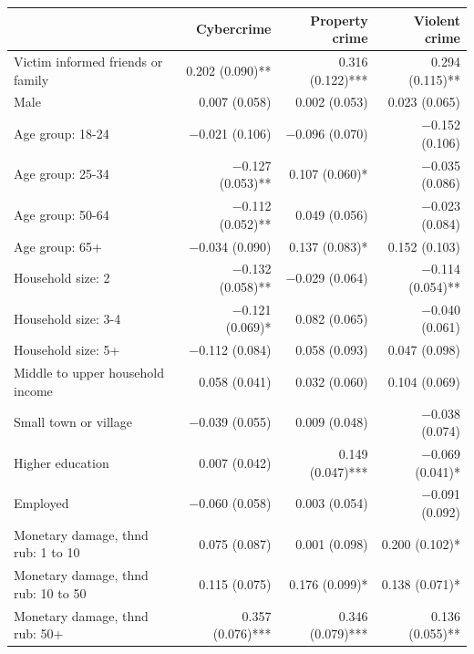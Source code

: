 \begingroup\centering
\begin{tabular}{lrrr}
	\addlinespace[5pt] 
	& Cybercrime & Property crime & Violent crime \\  
	\midrule

Victim informed friends or family & \num{0.202} (\num{0.090})** & \num{0.316} (\num{0.122})*** & \num{0.294} (\num{0.115})** \\
Male & \num{0.007} (\num{0.058}) & \num{0.002} (\num{0.053}) & \num{0.023} (\num{0.065}) \\
Age group: 18-24 & \num{-0.021} (\num{0.106}) & \num{-0.096} (\num{0.070}) & \num{-0.152} (\num{0.106}) \\
Age group: 25-34 & \num{-0.127} (\num{0.053})** & \num{0.107} (\num{0.060})* & \num{-0.035} (\num{0.086}) \\
Age group: 50-64 & \num{-0.112} (\num{0.052})** & \num{0.049} (\num{0.056}) & \num{-0.023} (\num{0.084}) \\
Age group:   65+ & \num{-0.034} (\num{0.090}) & \num{0.137} (\num{0.083})* & \num{0.152} (\num{0.103}) \\
Household size:   2 & \num{-0.132} (\num{0.058})** & \num{-0.029} (\num{0.064}) & \num{-0.114} (\num{0.054})** \\
Household size: 3-4 & \num{-0.121} (\num{0.069})* & \num{0.082} (\num{0.065}) & \num{-0.040} (\num{0.061}) \\
Household size:  5+ & \num{-0.112} (\num{0.084}) & \num{0.058} (\num{0.093}) & \num{0.047} (\num{0.098}) \\
Middle to upper household income & \num{0.058} (\num{0.041}) & \num{0.032} (\num{0.060}) & \num{0.104} (\num{0.069}) \\
Small town or village & \num{-0.039} (\num{0.055}) & \num{0.009} (\num{0.048}) & \num{-0.038} (\num{0.074}) \\
Higher education & \num{0.007} (\num{0.042}) & \num{0.149} (\num{0.047})*** & \num{-0.069} (\num{0.041})* \\
Employed & \num{-0.060} (\num{0.058}) & \num{0.003} (\num{0.054}) & \num{-0.091} (\num{0.092}) \\
Monetary damage, thnd rub:  1 to 10 & \num{0.075} (\num{0.087}) & \num{0.001} (\num{0.098}) & \num{0.200} (\num{0.102})* \\
Monetary damage, thnd rub: 10 to 50 & \num{0.115} (\num{0.075}) & \num{0.176} (\num{0.099})* & \num{0.138} (\num{0.071})* \\
Monetary damage, thnd rub:      50+ & \num{0.357} (\num{0.076})*** & \num{0.346} (\num{0.079})*** & \num{0.136} (\num{0.055})** \\

\end{tabular}
